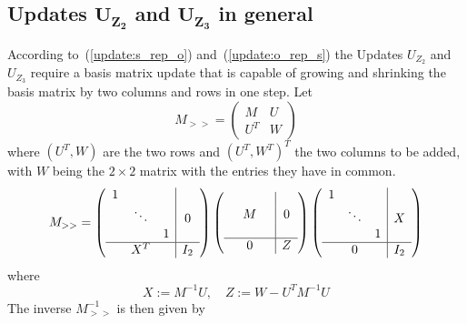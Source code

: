 \documentclass[a4paper]{article}
\begin{document}
\subsection{Updates $\mathbf{U_{Z_{2}}}$ and $\mathbf{U_{Z_{3}}}$ in general}
According to~(\ref{update:s_rep_o}) and~(\ref{update:o_rep_s}) the Updates
$U_{Z_{2}}$ and $U_{Z_{3}}$ require a basis matrix update that is capable of
growing and shrinking the basis matrix by two columns and rows in one step.
Let 
\begin{equation}
\label{def:U_W}
M_{>>}=
\left(
\begin{array}{c|c}
M & U \\
\hline
U^{T} & W
\end{array}
\right)
\end{equation}
where $(U^{T}, W)$ are the two rows and $(U^{T}, W^{T})^{T}$ the two columns
to be added, with $W$ being the $2 \times 2$ matrix with the entries
they have in common.
\begin{equation}
\label{product}
M_{>>}=
\left(
\begin{array}{ccc|c}
1	&	 &	&        \\
	& \ddots &	& 0      \\
	&	 & 1	&        \\
\hline
	& X^{T}  &      & I_{2}  \\
\end{array}
\right)
\left(
\begin{array}{ccc|c}
	&	 &	&        \\
	& M      &	& 0      \\
	&	 & 	&        \\
\hline
	& 0      &      & Z      \\
\end{array}
\right)
\left(
\begin{array}{ccc|c}
1	&	 &	&        \\
	& \ddots &	& X      \\
	&	 &  1	&        \\
\hline
	& 0      &      & I_{2}  \\
\end{array}
\right)
\end{equation}
where
\begin{equation}
\label{def:X_Z}
X:=M^{-1}U, \quad Z:=W - U^{T}M^{-1}U
\end{equation}
The inverse $M_{>>}^{-1}$ is then given by
\end{document}
